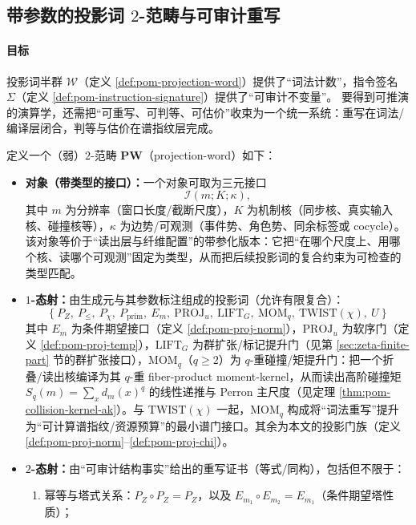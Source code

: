 \subsection{带参数的投影词 \texorpdfstring{$2$}{2}-范畴与可审计重写}\label{subsec:pom-2cat-rewrite}
\paragraph{目标}
投影词半群 $\mathcal W$（定义 \ref{def:pom-projection-word}）提供了“词法计数”，指令签名 $\Sigma$（定义 \ref{def:pom-instruction-signature}）提供了“可审计不变量”。
要得到可推演的演算学，还需把“可重写、可判等、可估价”收束为一个统一系统：重写在词法/编译层闭合，判等与估价在谱指纹层完成。

\begin{definition}\label{def:pom-projword-2cat}
定义一个（弱）$2$-范畴 $\mathbf{PW}$（projection-word）如下：
\begin{itemize}
  \item \textbf{对象（带类型的接口）：}一个对象可取为三元接口
  \[
  \mathcal{I}(m;K;\kappa),
  \]
  其中 $m$ 为分辨率（窗口长度/截断尺度），$K$ 为机制核（同步核、真实输入核、碰撞核等），$\kappa$ 为边势/可观测（事件势、角色势、同余标签或 cocycle）。该对象等价于“读出层与纤维配置”的带参化版本：它把“在哪个尺度上、用哪个核、读哪个可观测”固定为类型，从而把后续投影词的复合约束为可检查的类型匹配。
  \item \textbf{$1$-态射：}由生成元与其参数标注组成的投影词（允许有限复合）：
  \[
  \{\ P_Z,\ P_{\le},\ P_\chi,\ P_{\mathrm{prim}},\ E_m,\ \mathrm{PROJ}_u,\ \mathrm{LIFT}_G,\ \mathrm{MOM}_q,\ \mathrm{TWIST}(\chi),\ U\ \}
  \]
  其中 $E_m$ 为条件期望接口（定义 \ref{def:pom-proj-norm}），$\mathrm{PROJ}_u$ 为软序门（定义 \ref{def:pom-proj-temp}），$\mathrm{LIFT}_G$ 为群扩张/标记提升门（见第 \ref{sec:zeta-finite-part} 节的群扩张接口），$\mathrm{MOM}_q$（$q\ge2$）为 $q$-重碰撞/矩提升门：把一个折叠/读出核编译为其 $q$-重 fiber-product moment-kernel，从而读出高阶碰撞矩 \(S_q(m)=\sum_x d_m(x)^q\) 的线性递推与 Perron 主尺度（见定理 \ref{thm:pom-collision-kernel-ak}）。与 \(\mathrm{TWIST}(\chi)\) 一起，\(\mathrm{MOM}_q\) 构成将“词法重写”提升为“可计算谱指纹/资源预算”的最小谱门接口。其余为本文的投影门族（定义 \ref{def:pom-proj-norm}--\ref{def:pom-proj-chi}）。
  \item \textbf{$2$-态射：}由“可审计结构事实”给出的重写证书（等式/同构），包括但不限于：
  \begin{enumerate}
    \item 幂等与塔式关系：$P_Z\circ P_Z=P_Z$，以及 $E_{m_1}\circ E_{m_2}=E_{m_1}$（条件期望塔性质）；

\end{enumerate}
\end{itemize}
\end{definition}
